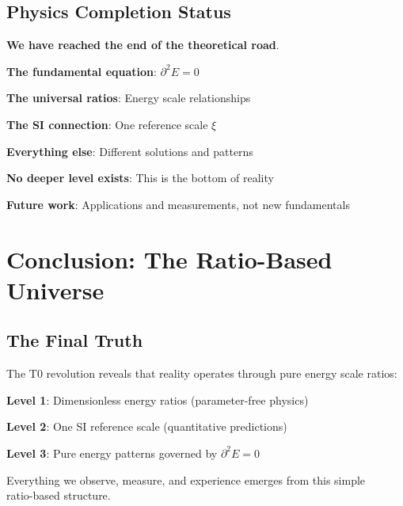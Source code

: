 \documentclass[12pt,a4paper]{article}
\newcommand{\Efield}{E}
\newcommand{\xipar}{\xi}
\theoremstyle{definition}
\theoremstyle{remark}
\begin{document}
										\subsection{Physics Completion Status}
										
							\begin{tcolorbox}[colback=yellow!5!white,colframe=orange!75!black,title=The End of Fundamental Physics]
								\textbf{We have reached the end of the theoretical road}.
								
								\textbf{The fundamental equation}: $\partial^2 \Efield = 0$
								
								\textbf{The universal ratios}: Energy scale relationships
								
								\textbf{The SI connection}: One reference scale $\xipar$
								
								\textbf{Everything else}: Different solutions and patterns
								
								\textbf{No deeper level exists}: This is the bottom of reality
								
								\textbf{Future work}: Applications and measurements, not new fundamentals
							\end{tcolorbox}
															
															\section{Conclusion: The Ratio-Based Universe}
															
															\subsection{The Final Truth}
															
															The T0 revolution reveals that reality operates through pure energy scale ratios:
															
															\textbf{Level 1}: Dimensionless energy ratios (parameter-free physics)
															
															\textbf{Level 2}: One SI reference scale (quantitative predictions)
															
															\textbf{Level 3}: Pure energy patterns governed by $\partial^2 \Efield = 0$
															
															Everything we observe, measure, and experience emerges from this simple \\
															ratio-based structure.
															
\end{document}
